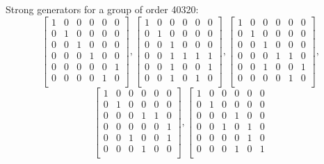 {\small\arraycolsep=2pt
Strong generators for a group of order 40320:
$$
\left[
\begin{array}{*{6}{r}}
1 & 0 & 0 & 0 & 0 & 0\\
0 & 1 & 0 & 0 & 0 & 0\\
0 & 0 & 1 & 0 & 0 & 0\\
0 & 0 & 0 & 1 & 0 & 0\\
0 & 0 & 0 & 0 & 0 & 1\\
0 & 0 & 0 & 0 & 1 & 0\\
\end{array}
\right]
, 
\left[
\begin{array}{*{6}{r}}
1 & 0 & 0 & 0 & 0 & 0\\
0 & 1 & 0 & 0 & 0 & 0\\
0 & 0 & 1 & 0 & 0 & 0\\
0 & 0 & 1 & 1 & 1 & 1\\
0 & 0 & 1 & 0 & 0 & 1\\
0 & 0 & 1 & 0 & 1 & 0\\
\end{array}
\right]
, 
\left[
\begin{array}{*{6}{r}}
1 & 0 & 0 & 0 & 0 & 0\\
0 & 1 & 0 & 0 & 0 & 0\\
0 & 0 & 1 & 0 & 0 & 0\\
0 & 0 & 0 & 1 & 1 & 0\\
0 & 0 & 1 & 0 & 0 & 1\\
0 & 0 & 0 & 0 & 1 & 0\\
\end{array}
\right]
, 
$$
$$
\left[
\begin{array}{*{6}{r}}
1 & 0 & 0 & 0 & 0 & 0\\
0 & 1 & 0 & 0 & 0 & 0\\
0 & 0 & 0 & 1 & 1 & 0\\
0 & 0 & 0 & 0 & 0 & 1\\
0 & 0 & 1 & 0 & 0 & 1\\
0 & 0 & 0 & 1 & 0 & 0\\
\end{array}
\right]
, 
\left[
\begin{array}{*{6}{r}}
1 & 0 & 0 & 0 & 0 & 0\\
0 & 1 & 0 & 0 & 0 & 0\\
0 & 0 & 0 & 1 & 0 & 0\\
0 & 0 & 1 & 0 & 1 & 0\\
0 & 0 & 0 & 0 & 1 & 0\\
0 & 0 & 0 & 1 & 0 & 1\\

\end{array}$$}
